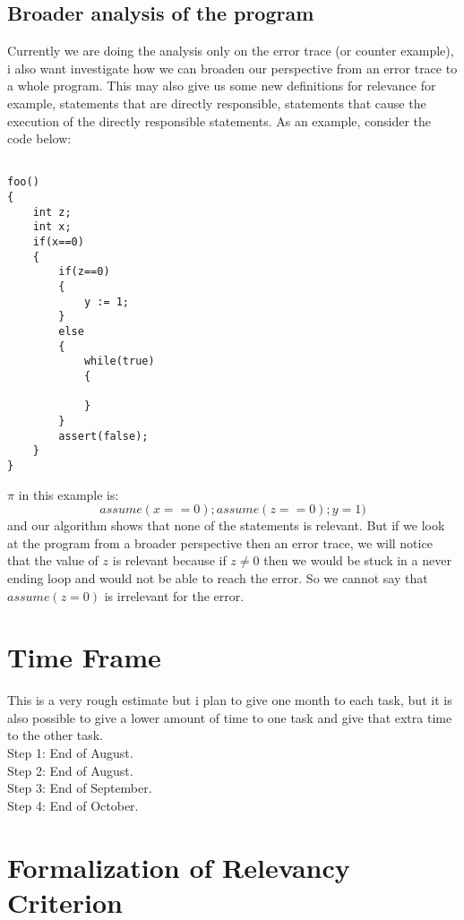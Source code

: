 \documentclass{article}
\begin{document}
\subsection{Broader analysis of the program}
Currently we are doing the analysis only on the error trace (or counter example), i also want investigate how we can broaden our perspective from an error trace to a whole program. This may also give us some new definitions for relevance for example, statements that are directly responsible, statements that cause the execution of the directly responsible statements. As an example, consider the code below:\\
\begin{lstlisting}

foo()
{
	int z;
	int x;
	if(x==0)
	{
		if(z==0)
		{
			y := 1;
		}
		else
		{
			while(true)
			{
				
			}
		}		
		assert(false);
	}	
}

\end{lstlisting}
$\pi$ in this example is:
$$ assume(x==0); assume(z==0); y=1) $$
and our algorithm shows that none of the statements is relevant. But if we look at the program from a broader perspective then an error trace, we will notice that the value of  $z$ is relevant because if $z \neq 0$ then we would be stuck in a never ending loop and would not be able to reach the error.  
So we cannot say that $assume(z=0)$ is irrelevant for the error.
\section{Time Frame}
This is a very rough estimate but i plan to give one month to each task, but it is also possible to give a lower amount of time to one task and give that extra time to the other task.\\
Step 1: End of August.\\
Step 2: End of August.\\
Step 3: End of September.\\
Step 4: End of October.
\newpage
\section{Formalization of Relevancy Criterion}
\end{document}
